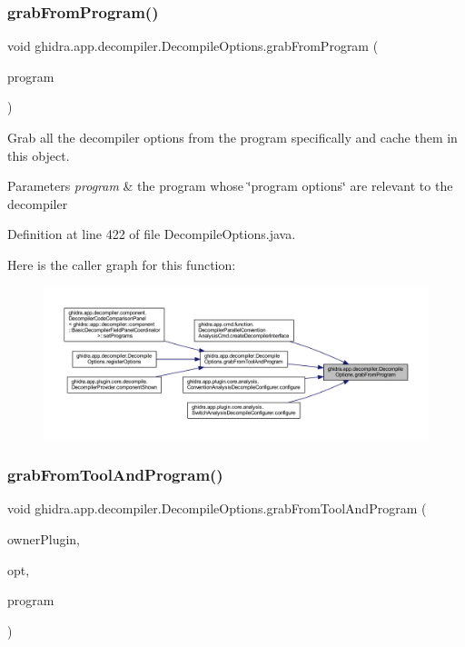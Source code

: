 \subsubsection{\texorpdfstring{grabFromProgram()}{grabFromProgram()}}
{\footnotesize\ttfamily void ghidra.\+app.\+decompiler.\+Decompile\+Options.\+grab\+From\+Program (\begin{DoxyParamCaption}\item[{Program}]{program }\end{DoxyParamCaption})\hspace{0.3cm}{\ttfamily [inline]}}

Grab all the decompiler options from the program specifically and cache them in this object. 
\begin{DoxyParams}{Parameters}
{\em program} & the program whose \char`\"{}program options\char`\"{} are relevant to the decompiler \\
\hline
\end{DoxyParams}


Definition at line 422 of file Decompile\+Options.\+java.

Here is the caller graph for this function\+:
\nopagebreak
\begin{figure}[H]
\begin{center}
\leavevmode
\includegraphics[width=350pt]{classghidra_1_1app_1_1decompiler_1_1_decompile_options_ac131faeedb338752984bd62826882313_icgraph}
\end{center}
\end{figure}
\mbox{\label{classghidra_1_1app_1_1decompiler_1_1_decompile_options_ab8e3369d5655403883252560a6d48d2f}} 
\subsubsection{\texorpdfstring{grabFromToolAndProgram()}{grabFromToolAndProgram()}}
{\footnotesize\ttfamily void ghidra.\+app.\+decompiler.\+Decompile\+Options.\+grab\+From\+Tool\+And\+Program (\begin{DoxyParamCaption}\item[{Plugin}]{owner\+Plugin,  }\item[{Tool\+Options}]{opt,  }\item[{Program}]{program }\end{DoxyParamCaption})\hspace{0.3cm}{\ttfamily [inline]}}


